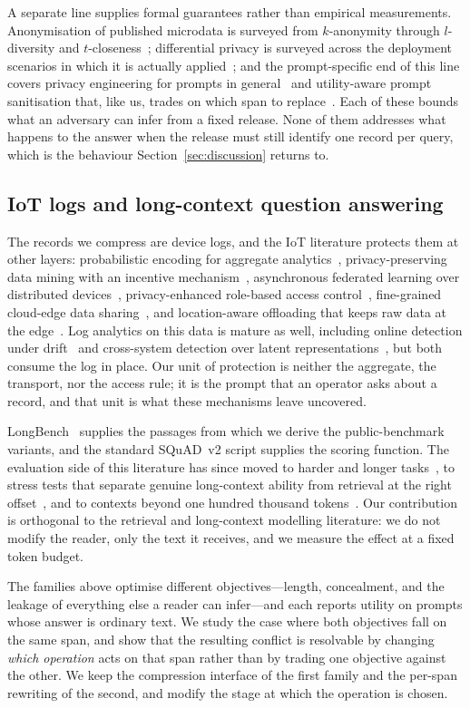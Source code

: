 A separate line supplies formal guarantees rather than empirical measurements. Anonymisation
of published microdata is surveyed from $k$-anonymity through $l$-diversity and
$t$-closeness~\cite{carvalho-microdata-2023}; differential privacy is surveyed across the
deployment scenarios in which it is actually applied~\cite{zhao-dp-2024}; and the
prompt-specific end of this line covers privacy engineering for prompts in
general~\cite{edemacu-prompt-2025} and utility-aware prompt sanitisation that, like us,
trades on which span to replace~\cite{shen-prosan-2026}. Each of these bounds what an
adversary can infer from a fixed release. None of them addresses what happens to the answer
when the release must still identify one record per query, which is the behaviour
Section~\ref{sec:discussion} returns to.

\subsection{IoT logs and long-context question answering}
The records we compress are device logs, and the IoT literature protects them at other
layers: probabilistic encoding for aggregate analytics~\cite{zaman-encode-2024},
privacy-preserving data mining with an incentive mechanism~\cite{gao-datamining-2024},
asynchronous federated learning over distributed devices~\cite{yan-fedlearn-2023},
privacy-enhanced role-based access control~\cite{zhang-rbac-2025}, fine-grained cloud-edge
data sharing~\cite{sun-sharing-2025}, and location-aware offloading that keeps raw data at the
edge~\cite{wang-offload-2024}. Log analytics on this data is mature as well, including online
detection under drift~\cite{tian-omlog-2025} and cross-system detection over latent
representations~\cite{zhou-logdlr-2025}, but both consume the log in place. Our unit of
protection is neither the aggregate, the transport, nor the access rule; it is the prompt that
an operator asks about a record, and that unit is what these mechanisms leave uncovered.

LongBench~\cite{longbench} supplies the passages from which we derive the public-benchmark
variants, and the standard SQuAD~v2 script supplies the scoring function. The evaluation side
of this literature has since moved to harder and longer tasks~\cite{bai-longbenchv2-2025}, to
stress tests that separate genuine long-context ability from retrieval at the right
offset~\cite{hsieh-ruler-2024,yen-helmet-2025}, and to contexts beyond one hundred thousand
tokens~\cite{zhang-infinitebench-2024}. Our contribution is orthogonal to the retrieval and
long-context modelling literature: we do not modify the reader, only the text it receives, and
we measure the effect at a fixed token budget.

The families above optimise different objectives---length, concealment, and the leakage of
everything else a reader can infer---and each reports utility on prompts whose answer is
ordinary text. We study the case where both objectives fall on the same span, and show that
the resulting conflict is resolvable by changing \emph{which operation} acts on that span
rather than by trading one objective against the other. We keep the compression interface of
the first family and the per-span rewriting of the second, and modify the stage at which the
operation is chosen.
